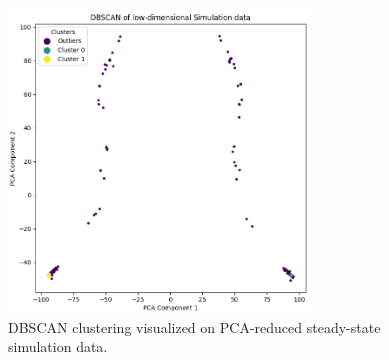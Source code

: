 \begin{figure}[ht]
    \centering
    \includegraphics[width=8cm]{images/Clustering/dbscan_pca_sim.png}
    \caption{DBSCAN clustering visualized on PCA-reduced steady-state simulation data.}
    \label{dbscanpca}
    \end{figure}

